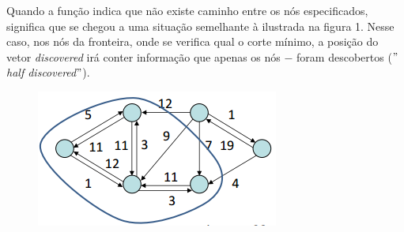 \documentclass[a4paper]{article}
\begin{document}
Quando a função indica que não existe caminho entre os nós especificados, significa que se chegou a uma situação semelhante à ilustrada na figura 1. Nesse caso, nos nós da fronteira, onde se verifica qual o corte mínimo, a posição do vetor \textit{discovered} irá conter informação que apenas os nós $-$ foram descobertos ($"$\textit{half discovered}$"$).


\begin{figure}[hb]
  \centering
  \includegraphics[scale=0.90]{slides.png}
  \caption{}
\end{figure}
\end{document}
